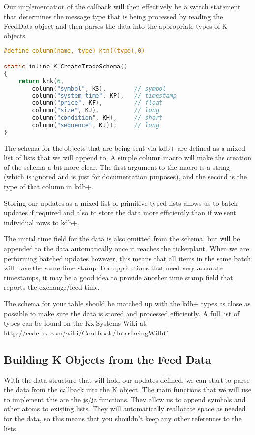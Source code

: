 Our implementation of the callback will then effectively be a switch statement that determines the message type
that is being processed by reading the FeedData object and then parses the data into the appropriate types of K
objects.

\begin{lstlisting}[language=C]
#define column(name, type) ktn((type),0)

static inline K CreateTradeSchema()
{
	return knk(6,
		column("symbol", KS),		 // symbol
		column("system time", KP),	 // timestamp
		column("price", KF),		 // float
		column("size", KJ),			 // long
		column("condition", KH),	 // short
		column("sequence", KJ));	 // long
}
\end{lstlisting}

The schema for the objects that are being sent via kdb+ are defined as a mixed list of lists that we will append
to. A simple column macro will make the creation of the schema a bit more clear. The first argument to the macro
is a string (which is ignored and is just for documentation purposes), and the second is the type of that column
in kdb+.

Storing our updates as a mixed list of primitive typed lists allows us to batch updates if required and also to
store the data more efficiently than if we sent individual rows to kdb+.

The initial time field for the data is also omitted from the schema, but will be appended to the data automatically
once it reaches the tickerplant. When we are performing batched updates however, this means that all items in the
same batch will have the same time stamp. For applications that need very accurate timestamps, it may be a good idea
to provide another time stamp field that reports the exchange/feed time.

The schema for your table should be matched up with the kdb+ types as close as possible to make sure the data is
stored and processed efficiently.  A full list of types can be found on the Kx Systems Wiki at: 
\url{http://code.kx.com/wiki/Cookbook/InterfacingWithC}

\subsection{Building K Objects from the Feed Data}

With the data structure that will hold our updates defined, we can start to parse the data from the callback into
the K object. The main functions that we will use to implement this are the js/ja functions. They allow us to append
symbols and other atoms to existing lists. They will automatically reallocate space as needed for the data, so this
means that you shouldn't keep any other references to the lists.

